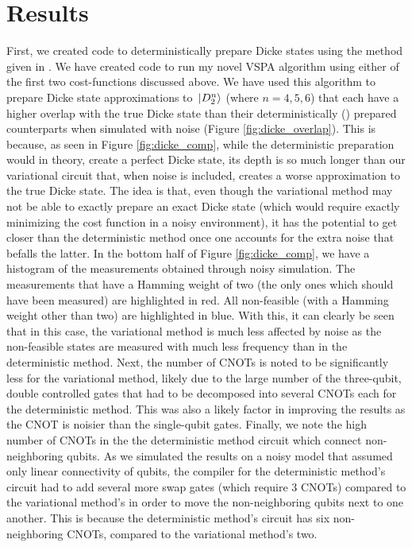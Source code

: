 \documentclass[Dual]{msu-thesis}
\begin{document}
\section{Results}

First, we created code to deterministically prepare Dicke states using the method given in \cite{ref:dicke_prep}. We have created code to run my novel VSPA algorithm using either of the first two cost-functions discussed above. We have used this algorithm to prepare Dicke state approximations to $\ket*{D^n_2}$ (where $n=4,5,6$) that each have a higher overlap with the true Dicke state than their deterministically (\cite{ref:dicke_prep}) prepared counterparts when simulated with noise (Figure \ref{fig:dicke_overlap}). This is because, as seen in Figure \ref{fig:dicke_comp}, while the deterministic preparation would in theory, create a perfect Dicke state, its depth is so much longer than our variational circuit that, when noise is included, creates a worse approximation to the true Dicke state. The idea is that, even though the variational method may not be able to exactly prepare an exact Dicke state (which would require exactly minimizing the cost function in a noisy environment), it has the potential to get closer than the deterministic method once one accounts for the extra noise that befalls the latter. In the bottom half of Figure \ref{fig:dicke_comp}, we have a histogram of the measurements obtained through noisy simulation. The measurements that have a Hamming weight of two (the only ones which should have been measured) are highlighted in red. All non-feasible (with a Hamming weight other than two) are highlighted in blue. With this, it can clearly be seen that in this case, the variational method is much less affected by noise as the non-feasible states are measured with much less frequency than in the deterministic method. Next, the number of CNOTs is noted to be significantly less for the variational method, likely due to the large number of the three-qubit, double controlled gates that had to be decomposed into several CNOTs each for the deterministic method. This was also a likely factor in improving the results as the CNOT is noisier than the single-qubit gates. Finally, we note the high number of CNOTs in the the deterministic method circuit which connect non-neighboring qubits. As we simulated the results on a noisy model that assumed only linear connectivity of qubits, the compiler for the deterministic method's circuit had to add several more swap gates (which require 3 CNOTs) compared to the variational method's in order to move the non-neighboring qubits next to one another. This is because the deterministic method's circuit has six non-neighboring CNOTs, compared to the variational method's two. 
\end{document}
